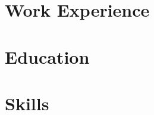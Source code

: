 \documentclass[letter,10pt]{article}
\begin{document}
% 

\section{Work Experience}


\section{Education}


\section{Skills}


% 


% 
\end{document}
